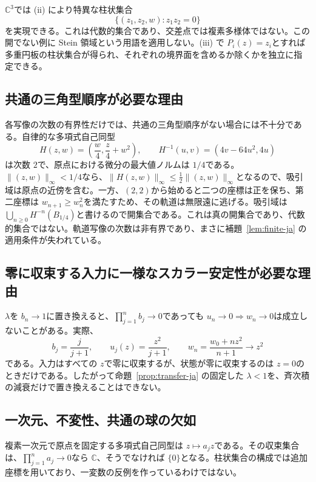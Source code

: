 \documentclass[12pt]{amsart}
\theoremstyle{definition}
\theoremstyle{remark}
\numberwithin{equation}{section}
\newcommand{\C}{\mathbb{C}}
\begin{document}
\allowbreak$\C^3$\allowbreak では (ii) により特異な柱状集合
\[
\{(z_1,z_2,w):z_1z_2=0\}
\]
を実現できる。これは代数的集合であり、交差点では複素多様体ではない。この開でない例に Stein 領域という用語を適用しない。(iii) で \allowbreak$P_i(z)=z_i$\allowbreak とすれば多重円板の柱状集合が得られ、それぞれの境界面を含めるか除くかを独立に指定できる。

\subsection{共通の三角型順序が必要な理由}
各写像の次数の有界性だけでは、共通の三角型順序がない場合には不十分である。自律的な多項式自己同型
\[
H(z,w)=\left(\frac w4,\frac z4+w^2\right),\qquad
H^{-1}(u,v)=(4v-64u^2,4u)
\]
は次数 \allowbreak$2$\allowbreak で、原点における微分の最大値ノルムは \allowbreak$1/4$\allowbreak である。\allowbreak$\|(z,w)\|_\infty<1/4$\allowbreak なら、\allowbreak$\|H(z,w)\|_\infty\leq\tfrac12\|(z,w)\|_\infty$\allowbreak となるので、吸引域は原点の近傍を含む。一方、\allowbreak$(2,2)$\allowbreak から始めると二つの座標は正を保ち、第二座標は \allowbreak$w_{n+1}\geq w_n^2$\allowbreak を満たすため、その軌道は無限遠に逃げる。吸引域は \allowbreak$\bigcup_{n\geq0}H^{-n}(B_{1/4})$\allowbreak と書けるので開集合である。これは真の開集合であり、代数的集合ではない。軌道写像の次数は非有界であり、まさに補題~\ref{lem:finite-ja} の適用条件が失われている。

\subsection{零に収束する入力に一様なスカラー安定性が必要な理由}
\allowbreak$\lambda$\allowbreak を \allowbreak$b_n\to1$\allowbreak に置き換えると、\allowbreak$\prod_{j=1}^n b_j\to0$\allowbreak であっても \allowbreak$u_n\to0\Rightarrow w_n\to0$\allowbreak は成立しないことがある。実際、
\[
b_j=\frac j{j+1},\qquad u_j(z)=\frac{z^2}{j+1},\qquad
w_n=\frac{w_0+nz^2}{n+1}\longrightarrow z^2
\]
である。入力はすべての \allowbreak$z$\allowbreak で零に収束するが、状態が零に収束するのは \allowbreak$z=0$\allowbreak のときだけである。したがって命題~\ref{prop:transfer-ja} の固定した \allowbreak$\lambda<1$\allowbreak を、斉次積の減衰だけで置き換えることはできない。

\subsection{一次元、不変性、共通の球の欠如}
複素一次元で原点を固定する多項式自己同型は \allowbreak$z\mapsto a_jz$\allowbreak である。その収束集合は、\allowbreak$\prod_{j=1}^n a_j\to0$\allowbreak なら \allowbreak$\C$\allowbreak、そうでなければ \allowbreak$\{0\}$\allowbreak となる。柱状集合の構成では追加座標を用いており、一変数の反例を作っているわけではない。
\end{document}
